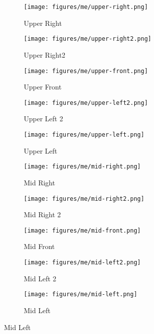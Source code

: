 \begin{figure}[!htb]
  \centering
  \begin{subfigure}[b]{0.18\linewidth}
    \texttt{[image: figures/me/upper-right.png]}
    \caption{Upper Right}
  \end{subfigure}
  \begin{subfigure}[b]{0.18\linewidth}
    \texttt{[image: figures/me/upper-right2.png]}
    \caption{Upper Right2}
  \end{subfigure}
  \begin{subfigure}[b]{0.18\linewidth}
    \texttt{[image: figures/me/upper-front.png]}
    \caption{Upper Front}
  \end{subfigure}
  \begin{subfigure}[b]{0.18\linewidth}
    \texttt{[image: figures/me/upper-left2.png]}
    \caption{Upper Left 2}
  \end{subfigure}
  \begin{subfigure}[b]{0.18\linewidth}
    \texttt{[image: figures/me/upper-left.png]}
    \caption{Upper Left}
  \end{subfigure}

  \begin{subfigure}[b]{0.18\linewidth}
    \texttt{[image: figures/me/mid-right.png]}
    \caption{Mid Right}
  \end{subfigure}
  \begin{subfigure}[b]{0.18\linewidth}
    \texttt{[image: figures/me/mid-right2.png]}
    \caption{Mid Right 2}
  \end{subfigure}
  \begin{subfigure}[b]{0.18\linewidth}
    \texttt{[image: figures/me/mid-front.png]}
    \caption{Mid Front}
  \end{subfigure}
  \begin{subfigure}[b]{0.18\linewidth}
    \texttt{[image: figures/me/mid-left2.png]}
    \caption{Mid Left 2}
  \end{subfigure}
  \begin{subfigure}[b]{0.18\linewidth}
    \texttt{[image: figures/me/mid-left.png]}
    \caption{Mid Left}
  \end{subfigure}


\end{figure}
